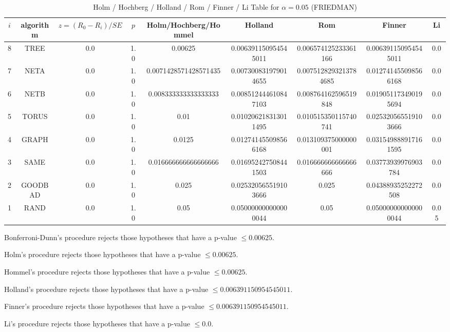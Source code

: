 \documentclass[a4paper,10pt]{article}
\begin{document}
\begin{landscape}
\begin{table}[!htp]
\begin{tabular}{
|r|r|r|r|r|r|r|r|r|r|}
\end{tabular}
\end{table}

\newpage

\begin{table}[!htp]
\centering\scriptsize
\caption{Holm / Hochberg / Holland / Rom / Finner / Li Table for $\alpha=0.05$ (FRIEDMAN)}
\begin{tabular}{ccccccccc}
$i$&algorithm&$z=(R_0 - R_i)/SE$&$p$&Holm/Hochberg/Hommel&Holland&Rom&Finner&Li\\
\hline
8& TREE&0.0&1.0&0.00625&0.006391150954545011&0.006574125233361166&0.006391150954545011&0.0\\
7& NETA&0.0&1.0&0.0071428571428571435&0.007300831979014655&0.0075128293213784685&0.012741455098566168&0.0\\
6& NETB&0.0&1.0&0.008333333333333333&0.008512444610847103&0.008764162596519848&0.019051173490195694&0.0\\
5& TORUS&0.0&1.0&0.01&0.010206218313011495&0.010515350115740741&0.025320565519103666&0.0\\
4& GRAPH&0.0&1.0&0.0125&0.012741455098566168&0.013109375000000001&0.031549888917161595&0.0\\
3& SAME&0.0&1.0&0.016666666666666666&0.016952427508441503&0.016666666666666666&0.03773939976903784&0.0\\
2& GOODBAD&0.0&1.0&0.025&0.025320565519103666&0.025&0.04388935252272508&0.0\\
1& RAND&0.0&1.0&0.05&0.050000000000000044&0.05&0.050000000000000044&0.05\\
\hline
\end{tabular}
\end{table}
Bonferroni-Dunn's procedure rejects those hypotheses that have a p-value $\le0.00625$.


Holm's procedure rejects those hypotheses that have a p-value $\le0.00625$.


Hommel's procedure rejects those hypotheses that have a p-value $\le0.00625$.


Holland's procedure rejects those hypotheses that have a p-value $\le0.006391150954545011$.


Finner's procedure rejects those hypotheses that have a p-value $\le0.006391150954545011$.


Li's procedure rejects those hypotheses that have a p-value $\le0.0$.



\newpage


\end{landscape}
\end{document}
